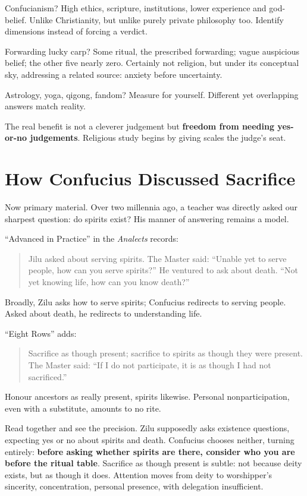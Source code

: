 Confucianism? High ethics, scripture, institutions, lower experience and god-belief. Unlike Christianity, but unlike purely private philosophy too. Identify dimensions instead of forcing a verdict.

Forwarding lucky carp? Some ritual, the prescribed forwarding; vague auspicious belief; the other five nearly zero. Certainly not religion, but under its conceptual sky, addressing a related source: anxiety before uncertainty.

Astrology, yoga, qigong, fandom? Measure for yourself. Different yet overlapping answers match reality.

The real benefit is not a cleverer judgement but \textbf{freedom from needing yes-or-no judgements}. Religious study begins by giving scales the judge's seat.

\section{How Confucius Discussed Sacrifice}
Now primary material. Over two millennia ago, a teacher was directly asked our sharpest question: do spirits exist? His manner of answering remains a model.

``Advanced in Practice'' in the \textit{Analects} records:

\begin{quote}
Jilu asked about serving spirits. The Master said: ``Unable yet to serve people, how can you serve spirits?'' He ventured to ask about death. ``Not yet knowing life, how can you know death?''
\end{quote}
Broadly, Zilu asks how to serve spirits; Confucius redirects to serving people. Asked about death, he redirects to understanding life.

``Eight Rows'' adds:

\begin{quote}
Sacrifice as though present; sacrifice to spirits as though they were present. The Master said: ``If I do not participate, it is as though I had not sacrificed.''
\end{quote}
Honour ancestors as really present, spirits likewise. Personal nonparticipation, even with a substitute, amounts to no rite.

Read together and see the precision. Zilu supposedly asks existence questions, expecting yes or no about spirits and death. Confucius chooses neither, turning entirely: \textbf{before asking whether spirits are there, consider who you are before the ritual table}. Sacrifice as though present is subtle: not because deity exists, but as though it does. Attention moves from deity to worshipper's sincerity, concentration, personal presence, with delegation insufficient.

